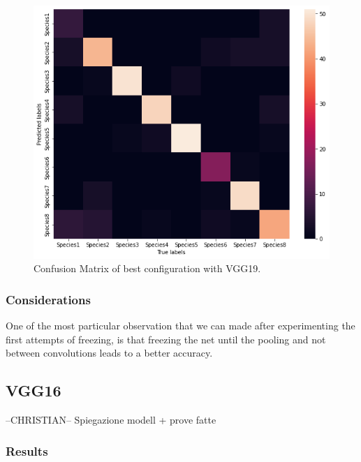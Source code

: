 \documentclass[10pt]{article}
\begin{document}
\begin{figure}[ht]
\begin{center}
\centerline{\includegraphics[width=\columnwidth]{VGG19_best}}
\caption{Confusion Matrix of best configuration with VGG19.}
\label{bayespic}
\end{center}
\end{figure}
\subsubsection{Considerations}
One of the most particular observation that we can made after experimenting the first attempts of freezing, is that freezing the net
until the pooling and not between convolutions leads to a better accuracy.

\subsection{VGG16}
--CHRISTIAN--
Spiegazione modell + prove fatte
\subsubsection{Results}
\end{document}
